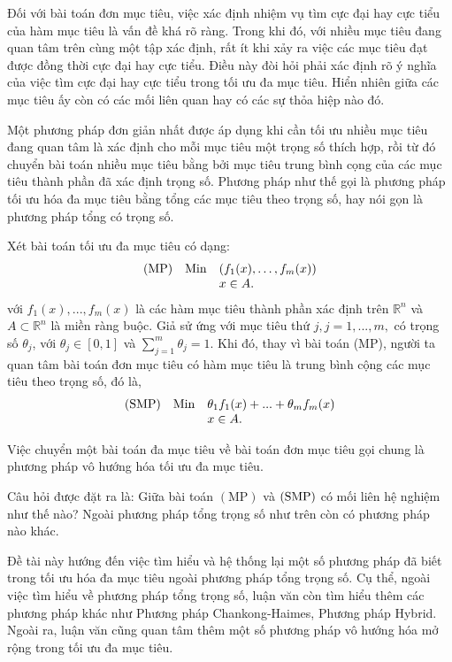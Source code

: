 \documentclass[12pt,a4paper]{report}
\begin{document}
Đối với bài toán đơn mục tiêu, việc xác định nhiệm vụ tìm cực đại hay cực tiểu của hàm mục tiêu là vấn đề khá rõ ràng. Trong khi đó, với nhiều mục tiêu đang quan tâm trên cùng một tập xác định, rất ít khi xảy ra việc các mục tiêu đạt được đồng thời cực đại hay cực tiểu. Điều này đòi hỏi phải xác định rõ ý nghĩa của việc  tìm cực đại hay cực tiểu trong tối ưu đa mục tiêu.  Hiển nhiên giữa các mục tiêu ấy còn có các mối liên quan hay có các sự thỏa hiệp nào đó.

Một phương pháp đơn giản nhất được áp dụng khi cần tối ưu  nhiều mục tiêu đang quan tâm là xác định cho mỗi mục tiêu một trọng số thích hợp, rồi từ đó chuyển bài toán nhiều mục tiêu bằng bởi mục tiêu trung bình cọng của  các mục tiêu thành phần đã xác định trọng số. Phương pháp như thế gọi là phương pháp tối ưu hóa đa mục tiêu bằng tổng các mục tiêu theo trọng số, hay nói gọn là phương pháp tổng có trọng số.

Xét bài toán tối ưu đa mục tiêu có dạng:
$$
\begin{array}{lll}
	{\rm (MP)}& {\rm Min}& (f_1(x),\ldots,f_m(x))\\
	&&x \in A.
\end{array}
$$
với  $ f_{1}(x),...,f_{m}(x)$  là các hàm mục tiêu thành phần xác định trên $\mathbb{R}^n$ và $A \subset \mathbb{R}^n$ là miền ràng buộc. Giả sử  ứng với mục tiêu thứ $j, j = 1,...,m,$ có  trọng số $\theta _j$, với $\theta _j \in \left[0,1 \right]$ và $\sum\limits_{j = 1}^m \theta _j  = 1$. Khi đó, thay vì bài toán (MP), người ta quan tâm bài toán đơn mục tiêu có hàm mục tiêu là trung bình cộng các mục tiêu theo trọng số, đó là,
$$
\begin{array}{lll}
	{\rm (SMP)}& {\rm Min}& \theta_1f_1(x)  + ... + \theta _m f_m(x)\\
	&&x \in A.
\end{array}
$$


Việc chuyển một bài toán đa mục tiêu về bài toán đơn mục tiêu gọi chung là phương pháp vô hướng hóa tối ưu đa mục tiêu.


Câu hỏi được đặt ra là:  Giữa bài toán $\mathrm{(MP)}$  và ${\rm (SMP)}$  có mối liên hệ nghiệm như thế nào? Ngoài phương pháp tổng trọng số như trên còn có phương pháp nào khác.

Đề tài này hướng đến việc tìm hiểu và hệ thống lại một số phương pháp đã biết trong tối ưu hóa đa mục tiêu ngoài phương pháp tổng trọng số. Cụ thể,  ngoài việc tìm hiểu về phương pháp tổng trọng số, luận văn còn tìm hiểu thêm các phương pháp khác như  Phương pháp Chankong-Haimes, Phương pháp Hybrid. Ngoài ra, luận văn cũng quan tâm thêm một số phương pháp vô hướng hóa mở rộng trong  tối ưu đa mục tiêu.
\end{document}
